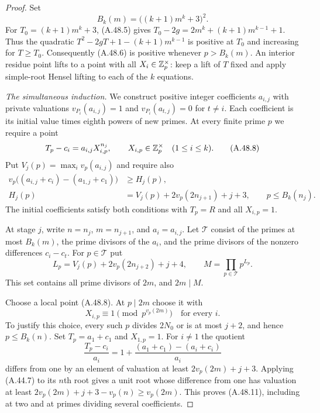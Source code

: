 \begin{proof}
Set
\[
             B_k(m)=\bigl((k+1)m^k+3\bigr)^2.
 \tag{A.48.7}
\]
For $T_0=(k+1)m^k+3$, (A.48.5) gives
$T_0-2g=2m^k+(k+1)m^{k-1}+1$.
Thus the quadratic
$T^2-2gT+1-(k+1)m^{k-1}$ is positive at $T_0$
and increasing for $T\ge T_0$.
Consequently (A.48.6) is positive whenever
$p>B_k(m)$. An interior residue point lifts
to a point with all $X_i\in\mathbb Z_p^\times$:
keep a lift of $T$ fixed and apply simple-root
Hensel lifting to each of the $k$ equations.

\emph{The simultaneous induction.}
We construct positive integer coefficients $a_{i,j}$
with private valuations $v_{P_i}(a_{i,j})=1$ and
$v_{P_i}(a_{t,j})=0$ for $t\ne i$. Each coefficient
is its initial value times eighth powers of new
primes. At every finite prime $p$ we require a
point
\[
 T_p-c_i=a_{i,j}X_{i,p}^{n_j},
       \qquad X_{i,p}\in\mathbb Z_p^\times
       \quad(1\le i\le k).
 \tag{A.48.8}
\]
Put $V_j(p)=\max_i v_p(a_{i,j})$ and require also
\[
 \begin{split}
 v_p\bigl((a_{i,j}+c_i)-(a_{1,j}+c_1)\bigr)
       &\ge H_j(p),\\
 H_j(p)&=V_j(p)+2v_p(2n_{j+1})+j+3,
       \qquad p\le B_k(n_j).
 \end{split}
 \tag{A.48.9}
\]
The initial coefficients satisfy both conditions
with $T_p=R$ and all $X_{i,p}=1$.

At stage $j$, write $n=n_j$, $m=n_{j+1}$,
and $a_i=a_{i,j}$. Let $\mathcal T$ consist of
the primes at most $B_k(m)$, the prime divisors
of the $a_i$, and the prime divisors of the
nonzero differences $c_i-c_t$. For $p\in\mathcal T$
put
\[
 L_p=V_j(p)+2v_p(2n_{j+2})+j+4,\qquad
 M=\prod_{p\in\mathcal T}p^{L_p}.
 \tag{A.48.10}
\]
This set contains all prime divisors of $2m$,
and $2m\mid M$.

Choose a local point (A.48.8). At $p\mid2m$
choose it with
\[
                 X_{i,p}\equiv1\pmod {p^{v_p(2m)}}
                       \quad\text{for every }i.
 \tag{A.48.11}
\]
To justify this choice, every such $p$ divides
$2N_0$ or is at most $j+2$, and hence
$p\le B_k(n)$. Set $T_p=a_1+c_1$ and
$X_{1,p}=1$. For $i\ne1$ the quotient
\[
 \frac{T_p-c_i}{a_i}
    =1+\frac{(a_1+c_1)-(a_i+c_i)}{a_i}
\]
differs from one by an element of valuation at
least $2v_p(2m)+j+3$. Applying (A.44.7) to its
$n$th root gives a unit root whose difference
from one has valuation at least
$2v_p(2m)+j+3-v_p(n)\ge v_p(2m)$.
This proves (A.48.11), including at two and at
primes dividing several coefficients.


\end{proof}

